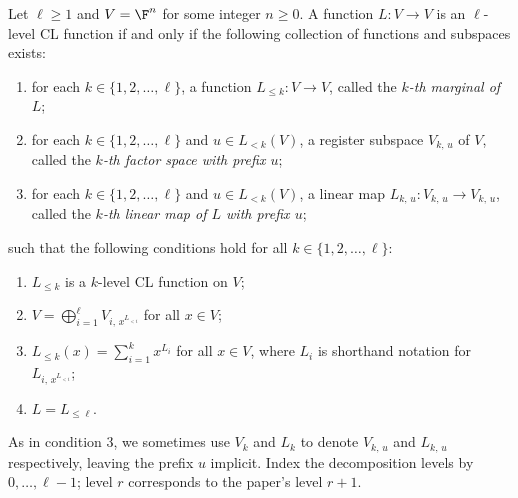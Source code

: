 \begin{lemma}\label{lem:cl-kth}
	\leanok
	Let $\ell \ge 1$ and $V = \F^n$ for some integer $n \ge 0$. A function $L \colon V \to V$ is an $\ell$-level CL function if and only if the following collection of functions and subspaces exists:
	\begin{enumerate}
		\item[(i)] for each $k \in \{1, 2, \dots, \ell\}$, a function $L_{\le k} \colon V \to V$, called the \emph{$k$-th marginal of $L$};
		\item[(ii)] for each $k \in \{1, 2, \dots, \ell\}$ and $u \in L_{<k}(V)$, a register subspace $V_{k,\,u}$ of $V$, called the \emph{$k$-th factor space with prefix $u$};
		\item[(iii)] for each $k \in \{1, 2, \dots, \ell\}$ and $u \in L_{<k}(V)$, a linear map $L_{k,\,u} \colon V_{k,\,u} \to V_{k,\,u}$, called the \emph{$k$-th linear map of $L$ with prefix $u$};
	\end{enumerate}
	such that the following conditions hold for all $k \in \{1, 2, \dots, \ell\}$:
	\begin{enumerate}
		\item $L_{\le k}$ is a $k$-level CL function on $V$;
		\item $V = \bigoplus_{i=1}^{\ell} V_{i,\,x^{L_{<i}}}$ for all $x \in V$;
		\item $L_{\le k}(x) = \sum_{i=1}^{k} x^{L_i}$ for all $x \in V$, where $L_i$ is shorthand notation for $L_{i,\,x^{L_{<i}}}$;
		\item $L = L_{\le \ell}$.
	\end{enumerate}
	As in condition 3, we sometimes use $V_k$ and $L_k$ to denote $V_{k,\,u}$ and $L_{k,\,u}$ respectively, leaving the prefix $u$ implicit.
	Index the decomposition levels by $0,\ldots,\ell-1$; level $r$ corresponds
	to the paper's level $r+1$.
\end{lemma}
